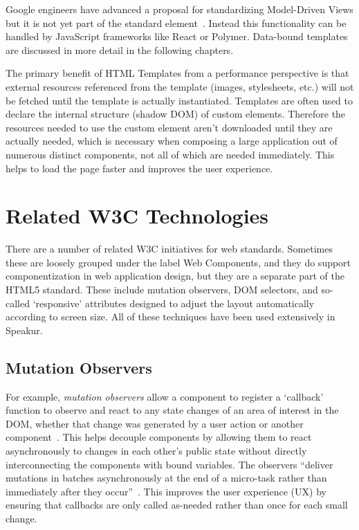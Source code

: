 Google engineers have advanced a proposal for standardizing 
Model-Driven Views
but it is not yet part of the standard  element~\cite{googledevelopers2014}.
Instead this functionality can be handled by JavaScript frameworks like React or Polymer.
Data-bound templates are discussed in more detail in the following chapters.

The primary benefit of HTML Templates from a performance perspective is that external resources referenced from the template (images, stylesheets, etc.) will not be fetched until the template is actually instantiated.
Templates are often used to declare the internal structure (shadow DOM) of custom elements. 
Therefore the resources needed to use the custom element aren't downloaded until they are actually needed, which is necessary when composing a large application out of numerous distinct components, 
not all of which are needed immediately.
This helps to load the page faster and improves the user experience.

\section{Related W3C Technologies}
There are a number of related W3C initiatives for web standards. 
Sometimes these are loosely grouped under the label Web Components,
and they do support componentization in web application design, 
but they are a separate part of the HTML5 standard.
These include mutation observers, 
DOM selectors, 
and so-called `responsive' attributes designed to adjust the layout automatically according to screen size.
All of these techniques have been used extensively in Speakur.

\subsection{Mutation Observers}
\label{sec:bgmutation}
For example, \textit{mutation observers}
allow a component to register a `callback' function to observe and react to any state changes of an area of interest in the DOM, 
whether that change was generated by a user action or another 
component~\cite{w3ccontributors2014}.
This helps decouple components by allowing them to react asynchronously to changes in each other's public state without directly interconnecting the components with bound variables.
The observers ``deliver mutations in batches asynchronously at the end of a micro-task rather than immediately after they occur''~\cite{addyosmani2014}.
This improves the user experience (UX) by ensuring that callbacks are only called as-needed rather than once for each small change.

